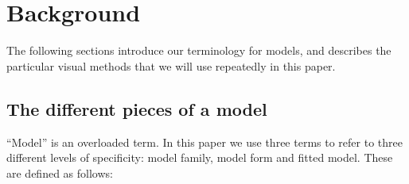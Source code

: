 \documentclass[preprint]{imsart}
\begin{document}
\section{Background}
\label{sec:model}

The following sections introduce our terminology for models, and describes the particular visual methods that we will use repeatedly in this paper.





\subsection{The different pieces of a model}

``Model'' is an overloaded term. In this paper we use three terms to refer to three different levels of specificity: model family, model form and fitted model.  These are defined as follows:
\end{document}
